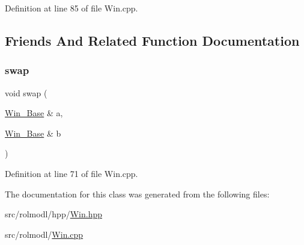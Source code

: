 Definition at line 85 of file Win.\+cpp.



\subsection{Friends And Related Function Documentation}
\mbox{\label{classrolmodl_1_1_win___base_a4f8fa1bc42c64d1dddf12ffc78041465}} 
\subsubsection{\texorpdfstring{swap}{swap}}
{\footnotesize\ttfamily void swap (\begin{DoxyParamCaption}\item[{\mbox{\hyperlink{classrolmodl_1_1_win___base}{Win\+\_\+\+Base}} \&}]{a,  }\item[{\mbox{\hyperlink{classrolmodl_1_1_win___base}{Win\+\_\+\+Base}} \&}]{b }\end{DoxyParamCaption})\hspace{0.3cm}{\ttfamily [friend]}}



Definition at line 71 of file Win.\+cpp.



The documentation for this class was generated from the following files\+:\begin{DoxyCompactItemize}
\item 
src/rolmodl/hpp/\mbox{\hyperlink{_win_8hpp}{Win.\+hpp}}\item 
src/rolmodl/\mbox{\hyperlink{_win_8cpp}{Win.\+cpp}}\end{DoxyCompactItemize}
